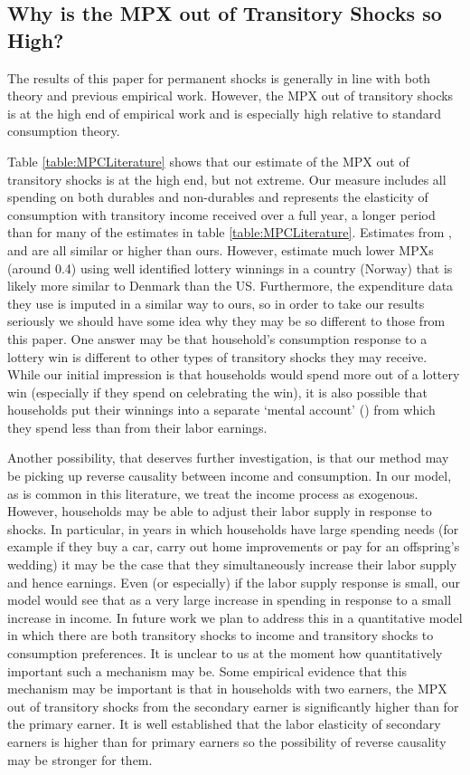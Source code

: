 \subsection{Why is the MPX out of Transitory Shocks so High?} \label{whysohigh}
The results of this paper for permanent shocks is generally in line with both theory and previous empirical work. However, the MPX out of transitory shocks is at the high end of empirical work and is especially high relative to standard consumption theory.

Table \ref{table:MPCLiterature} shows that our estimate of the MPX out of transitory shocks is at the high end, but not extreme. Our measure includes all spending on both durables and non-durables and represents the elasticity of consumption with transitory income received over a full year, a longer period than for many of the estimates in table \ref{table:MPCLiterature}. Estimates from \cite{agarwal_consumption_2014}, \cite{parker_consumer_2013} and \cite{souleles_response_1999} are all similar or higher than ours. However, \cite{fagereng_mpc_2016} estimate much lower MPXs (around 0.4) using well identified lottery winnings in a country (Norway) that is likely more similar to Denmark than the US. Furthermore, the expenditure data they use is imputed in a similar way to ours, so in order to take our results seriously we should have some idea why they may be so different to those from this paper. One answer may be that household's consumption response to a lottery win is different to other types of transitory shocks they may receive. While our initial impression is that households would spend more out of a lottery win (especially if they spend on celebrating the win), it is also possible that households put their winnings into a separate `mental account' (\cite{thaler_mental_1985}) from which they spend less than from their labor earnings. 

Another possibility, that deserves further investigation, is that our method may be picking up reverse causality between income and consumption. In our model, as is common in this literature, we treat the income process as exogenous. However, households may be able to adjust their labor supply in response to shocks. In particular, in years in which households have large spending needs (for example if they buy a car, carry out home improvements or pay for an offspring's wedding) it may be the case that they simultaneously increase their labor supply and hence earnings. Even (or especially) if the labor supply response is small, our model would see that as a very large increase in spending in response to a small increase in income. In future work we plan to address this in a quantitative model in which there are both transitory shocks to income and transitory shocks to consumption preferences. It is unclear to us at the moment how quantitatively important such a mechanism may be. Some empirical evidence that this mechanism may be important is that in households with two earners, the MPX out of transitory shocks from the secondary earner is significantly higher than for the primary earner. It is well established that the labor elasticity of secondary earners is higher than for primary earners so the possibility of reverse causality may be stronger for them.

